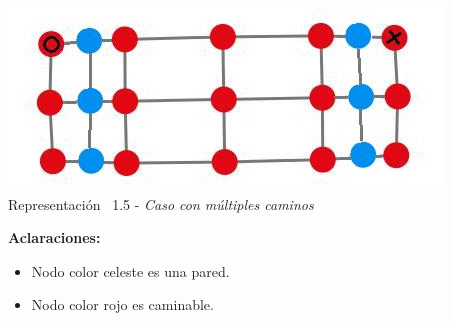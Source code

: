 \vspace*{0.3cm} \vspace*{0.3cm}
  \begin{center}
 \includegraphics[scale=0.5]{./EJ1/ej1graforandom.jpeg}
 \\{Representaci\'on \ 1.5 - \textit{Caso con m\'ultiples caminos}}
  \end{center}
  \vspace*{0.3cm}

\textbf{Aclaraciones:} 
\begin{itemize}
\item Nodo color celeste es una pared.
\item Nodo color rojo es caminable.
\end{itemize}
